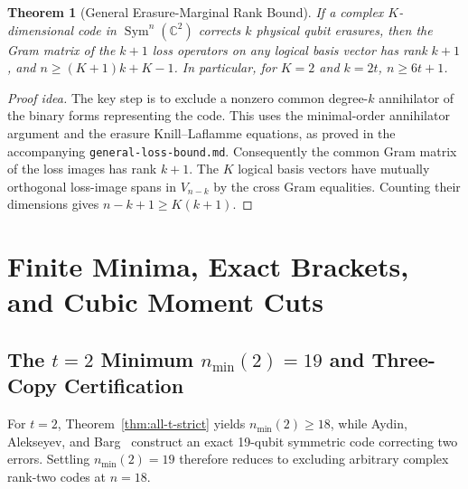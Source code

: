 \documentclass[11pt,letterpaper]{article}
\newtheorem{theorem}{Theorem}[section]
\theoremstyle{definition}
\theoremstyle{remark}
\newcommand{\Sym}{\operatorname{Sym}}
\newcommand{\C}{\mathbb{C}}
\begin{document}
\begin{theorem}[General Erasure-Marginal Rank Bound]\label{thm:loss}
If a complex $K$-dimensional code in $\Sym^n(\C^2)$ corrects $k$ physical qubit erasures, then the Gram matrix of the $k+1$ loss operators on any logical basis vector has rank $k+1$, and $n \ge (K+1)k + K - 1$. In particular, for $K=2$ and $k=2t$, $n \ge 6t+1$.
\end{theorem}
\begin{proof}[Proof idea]
The key step is to exclude a nonzero common degree-$k$ annihilator of the binary forms representing the code. This uses the minimal-order annihilator argument and the erasure Knill--Laflamme equations, as proved in the accompanying \texttt{general-loss-bound.md}. Consequently the common Gram matrix of the loss images has rank $k+1$. The $K$ logical basis vectors have mutually orthogonal loss-image spans in $V_{n-k}$ by the cross Gram equalities. Counting their dimensions gives $n-k+1\ge K(k+1)$.
\end{proof}

\section{Finite Minima, Exact Brackets, and Cubic Moment Cuts}

\subsection{The $t=2$ Minimum $n_{\min}(2)=19$ and Three-Copy Certification}
For $t=2$, Theorem~\ref{thm:all-t-strict} yields $n_{\min}(2) \ge 18$, while Aydin, Alekseyev, and Barg~\cite{AAB2024} construct an exact 19-qubit symmetric code correcting two errors. Settling $n_{\min}(2)=19$ therefore reduces to excluding arbitrary complex rank-two codes at $n=18$.
\end{document}
